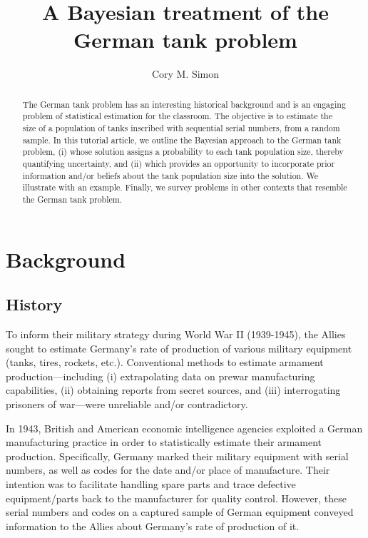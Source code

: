 \documentclass[11pt, oneside]{article}
\title{A Bayesian treatment of the German tank problem}
\author[1]{Cory M. Simon}
\affil[1]{School of Chemical, Biological, and Environmental Engineering. Oregon State University. Corvallis, OR. USA. }
\affil[]{\texttt{cory.simon@oregonstate.edu}}
\begin{document}
\maketitle

\begin{abstract}
	The German tank problem has an interesting historical background and is an engaging problem of statistical estimation for the classroom. The objective is to estimate the size of a population of tanks inscribed with sequential serial numbers, from a random sample. In this tutorial article, we outline the Bayesian approach to the German tank problem, (i) whose solution assigns a probability to each tank population size, thereby quantifying uncertainty, and (ii) which provides an opportunity to incorporate prior information and/or beliefs about the tank population size into the solution. We illustrate with an example. Finally, we survey problems in other contexts that resemble the German tank problem.
\end{abstract}

\clearpage

\section{Background}

\subsection{History}
To inform their military strategy during World War II (1939-1945), the Allies sought to estimate Germany's rate of production of various military equipment (tanks, tires, rockets, etc.).
Conventional methods to estimate armament production---including 
(i) extrapolating data on prewar manufacturing capabilities, 
(ii) obtaining reports from secret sources, and 
(iii) interrogating prisoners of war---were unreliable and/or contradictory. 

In 1943, British and American economic intelligence agencies exploited a German manufacturing practice in order to statistically estimate their armament production. 
Specifically, Germany marked their military equipment with serial numbers, as well as codes for the date and/or place of manufacture. Their intention was to facilitate handling spare parts and trace defective equipment/parts back to the manufacturer for quality control.
However, these serial numbers and codes on a captured sample of German equipment conveyed information to the Allies about Germany's rate of production of it.
\end{document}
